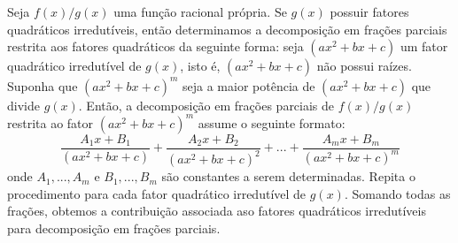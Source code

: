 	 Seja $f(x)/g(x)$ uma função racional própria. Se $g(x)$ possuir fatores quadráticos irredutíveis, então determinamos a decomposição em frações parciais restrita aos fatores quadráticos da seguinte forma: seja $(ax^2 + bx + c)$ um fator quadrático irredutível de $g(x)$, isto é, $(ax^2 + bx + c)$ não possui raízes. Suponha que $(ax^2 + bx + c)^m$ seja a maior potência de $(ax^2 + bx + c)$ que divide $g(x)$. Então, a decomposição em frações parciais de $f(x)/g(x)$ restrita ao fator $(ax^2 + bx + c)^m$ assume o seguinte formato:
	 $$\frac{A_1x + B_1}{(ax^2 + bx + c)} + \frac{A_2x + B_2}{(ax^2 + bx + c)^2} + ... + \frac{A_mx + B_m}{(ax^2 + bx + c)^m}$$    
	onde $A_1, ..., A_m$ e $B_1, ... , B_m$ são constantes a serem determinadas. Repita o procedimento para cada fator quadrático irredutível de $g(x)$. Somando todas as frações, obtemos a contribuição associada aso fatores quadráticos irredutíveis para decomposição em frações parciais.
	

